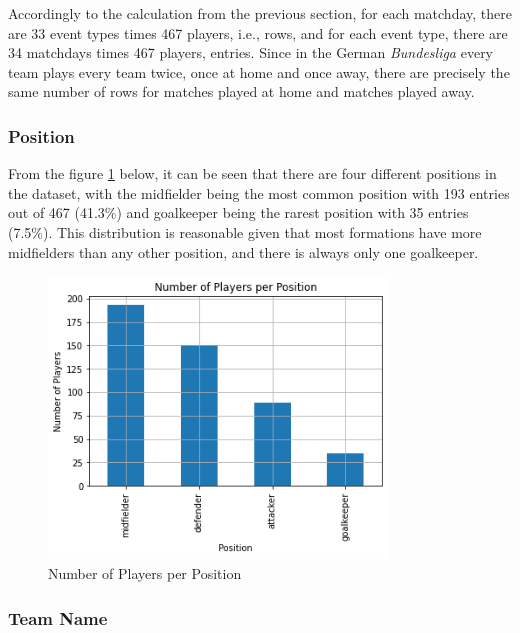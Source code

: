 Accordingly to the calculation from the previous section, for each matchday, there are 33 event types times 467 players, i.e.,  rows, and for each event type, there are 34 matchdays times 467 players,  entries. Since in the German \emph{Bundesliga} every team plays every team twice, once at home and once away, there are precisely the same number of rows for matches played at home and matches played away.

\subsubsection{Position}

From the figure \ref{fig:number_of_players_per_position} below, it can be seen that there are four different positions in the dataset, with the midfielder being the most common position with 193 entries out of 467 (41.3\%) and goalkeeper being the rarest position with 35 entries (7.5\%). This distribution is reasonable given that most formations have more midfielders than any other position, and there is always only one goalkeeper.

\begin{figure}[H]
    \centering
    \includegraphics[width=9cm]{chapter/4_implementation/section/2_data/section/figures/number_of_players_per_position.png}
    \captionsetup{justification=centering}
    \caption{Number of Players per Position}
    \label{fig:number_of_players_per_position}
\end{figure}

\subsubsection{Team Name}

